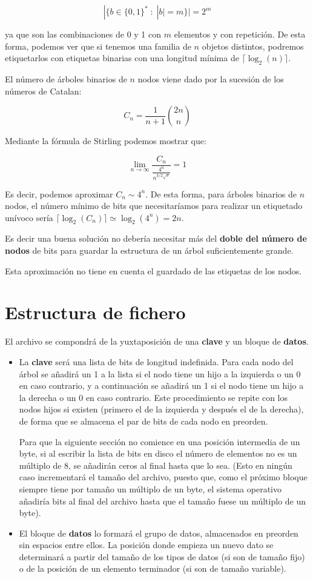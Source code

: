 \documentclass{article}
\begin{document}
\[|\{b \in \{0,1\}^{\ast} \; : \; |b| = m\}| = 2^m\]

ya que son las combinaciones de 0 y 1 con $m$ elementos y con repetición. De esta
forma, podemos ver que si tenemos una familia de $n$ objetos distintos, podremos
etiquetarlos con etiquetas binarias con una longitud mínima de
$\lceil \log_2(n) \rceil$.

El número de árboles binarios de $n$ nodos viene dado por la sucesión de los números
de Catalan:

\[C_n = \frac{1}{n+1} {2n\choose n} \]


Mediante la fórmula de Stirling podemos mostrar que:

\[\lim_{n \to \infty} \frac{C_n}{\frac{4^n}{n^{3/2\sqrt{\pi}}}} = 1\]

Es decir, podemos aproximar $C_n \sim 4^n$. De esta forma, para árboles binarios
de $n$ nodos, el número mínimo de bits que necesitaríamos para realizar un
etiquetado unívoco sería $\lceil \log_2(C_n) \rceil \simeq \log_2(4^n) = 2n$.

Es decir una buena solución no debería necesitar más del
\textbf{doble del número de nodos} de bits para guardar la estructura de un
árbol suficientemente grande.

Esta aproximación no tiene en cuenta el guardado de las etiquetas de los nodos.

\section{Estructura de fichero}

El archivo se compondrá de la yuxtaposición de una \textbf{clave} y un
bloque de \textbf{datos}.

\begin{itemize}
	\item La \textbf{clave} será una lista de bits de longitud indefinida.
  Para cada nodo del árbol se añadirá un 1 a la lista si el nodo tiene un hijo a
  la izquierda o un 0 en caso contrario, y a continuación se añadirá un 1 si el
  nodo tiene un hijo a la derecha o un 0 en caso contrario. Este procedimiento
  se repite con los nodos hijos si existen (primero el de la izquierda y después
  el de la derecha), de forma que se almacena el par de bits de cada nodo en preorden.

  Para que la siguiente sección no comience en una posición intermedia de un byte,
  si al escribir la lista de bits en disco el número de elementos no es un múltiplo
  de 8, se añadirán ceros al final hasta que lo sea. (Esto en ningún caso
  incrementará el tamaño del archivo, puesto que, como el próximo bloque siempre
  tiene por tamaño un múltiplo de un byte, el sistema operativo añadiría bits al
  final del archivo hasta que el tamaño fuese un múltiplo de un byte).
	\item El bloque de \textbf{datos} lo formará el grupo de datos, almacenados
  en preorden sin espacios entre ellos. La posición donde empieza un nuevo dato
  se determinará a partir del tamaño de los tipos de datos (si son de tamaño fijo)
  o de la posición de un elemento terminador (si son de tamaño variable).
\end{itemize}
\end{document}
